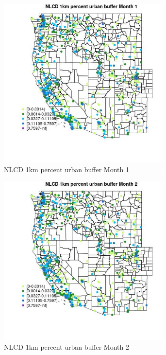 \begin{figure} 
\centering  
\includegraphics[width=0.77\textwidth]{Code_Outputs/Report_ML_input_PM25_Step4_part_e_de_duplicated_aves_compiled_2019-05-21wNAs_MapObsMo1NLCD_1km_percent_urban_buffer.jpg} 
\caption{\label{fig:Report_ML_input_PM25_Step4_part_e_de_duplicated_aves_compiled_2019-05-21wNAsMapObsMo1NLCD_1km_percent_urban_buffer}NLCD 1km percent urban buffer Month 1} 
\end{figure} 
 

\begin{figure} 
\centering  
\includegraphics[width=0.77\textwidth]{Code_Outputs/Report_ML_input_PM25_Step4_part_e_de_duplicated_aves_compiled_2019-05-21wNAs_MapObsMo2NLCD_1km_percent_urban_buffer.jpg} 
\caption{\label{fig:Report_ML_input_PM25_Step4_part_e_de_duplicated_aves_compiled_2019-05-21wNAsMapObsMo2NLCD_1km_percent_urban_buffer}NLCD 1km percent urban buffer Month 2} 
\end{figure} 
 


